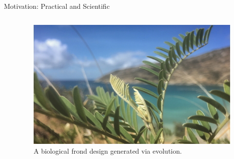\begin{frame}{Motivation: Practical and Scientific}
\begin{columns}
\begin{column}{0.6\textwidth}

\end{column}
\begin{column}{0.4\textwidth}
\begin{center}
\begin{figure}
\includegraphics[width=\textwidth,trim={43cm 0 47cm 8cm},clip]{img/island_fern}
\caption{A biological frond design generated via evolution.}
\end{figure}
\end{center}
\end{column}
\end{columns}
\end{frame}
